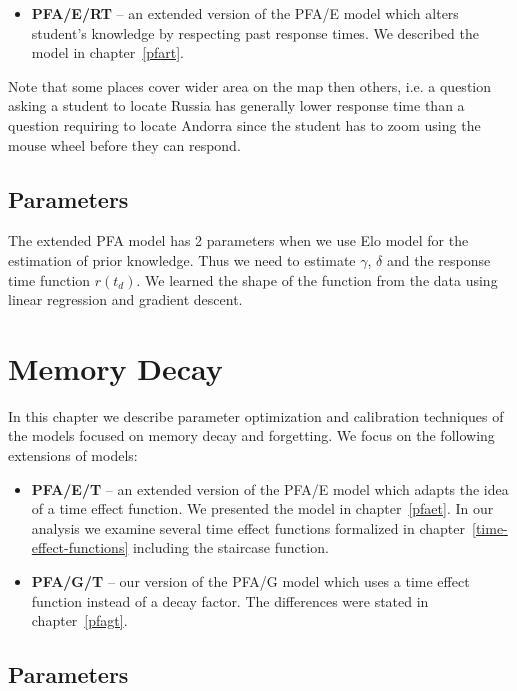 \begin{itemize}
  \item \textbf{PFA/E/RT} -- an extended version of the PFA/E model which alters student's knowledge by respecting past response times. We described the model in chapter~\ref{pfart}.
\end{itemize}

Note that some places cover wider area on the map then others, i.e. a question asking a student to locate Russia has generally lower response time than a question requiring to locate Andorra since the student has to zoom using the mouse wheel before they can respond.

\subsection{Parameters}
\label{response-parameters}

The extended PFA model has 2 parameters when we use Elo model for the estimation of prior knowledge. Thus we need to estimate $\gamma$, $\delta$ and the response time function $r(t_d)$. We learned the shape of the function from the data using linear regression and gradient descent.

\section{Memory Decay}

In this chapter we describe parameter optimization and calibration techniques of the models focused on memory decay and forgetting. We focus on the following extensions of models:

\begin{itemize}
  \item \textbf{PFA/E/T} -- an extended version of the PFA/E model which adapts the idea of a time effect function. We presented the model in chapter~\ref{pfaet}. In our analysis we examine several time effect functions formalized in chapter~\ref{time-effect-functions} including the staircase function.
  \item \textbf{PFA/G/T} -- our version of the PFA/G model which uses a time effect function instead of a decay factor. The differences were stated in chapter~\ref{pfagt}.
\end{itemize}

\subsection{Parameters}
\label{memory-parameters}


